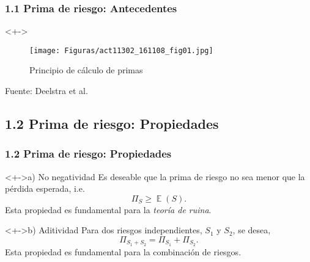 \documentclass[cjk,t,compress]{beamer}
\newcommand{\field}[1]{\mathbb{#1}}
\newcommand{\expec}{\operatorname{\field{E}}}
\begin{document}
\begin{frame}[fragile]
	\frametitle{1.1 Prima de riesgo: Antecedentes}
	\scriptsize  	
		
		\begin{block}<+->{}
		\vspace{0.1cm}
		\begin{figure}[hbtp]
		\caption{Principio de c\'alculo de primas}
		\centering
		\texttt{[image: Figuras/act11302\_161108\_fig01.jpg]}
		\end{figure}
		{\tiny Fuente: Deelstra et al.}
		\end{block}  		
	
\end{frame}

%
%
\subsection{1.2 Prima de riesgo: Propiedades}
\begin{frame}[fragile]
	\frametitle{1.2 Prima de riesgo: Propiedades}
	\scriptsize  	
		
		\vspace{0.2cm}
		\begin{block}<+->{a) No negatividad}
		\vspace{0.1cm}
		Es deseable que la prima de riesgo no sea menor que la p\'erdida esperada, i.e.
		\begin{equation}
			\Pi_S \geq \expec(S).
		\end{equation}
		\textcolor{MyDarkGreen}{Esta propiedad es fundamental para la {\it teor\'ia de ruina}.}
		\end{block}  		

		\vspace{0.2cm}
		\begin{block}<+->{b) Aditividad}
		\vspace{0.1cm}
		Para dos riesgos independientes, $S_1$ y $S_2$, se desea,
		\begin{equation}
			\Pi_{S_1+S_2} = \Pi_{S_1}+ \Pi_{S_2}.
		\end{equation}
		\textcolor{MyDarkGreen}{Esta propiedad es fundamental para la combinaci\'on de riesgos.}
		\end{block}  		
	
\end{frame}
\end{document}
